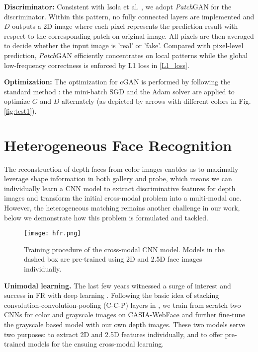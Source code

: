 \documentclass{bmvc2k}
\begin{document}
\textbf{Discriminator:} Consistent with Isola et al. \cite{isola2016image}, we adopt \textit{Patch}GAN for the discriminator. Within this pattern, no fully connected layers are implemented and $D$ outputs a 2D image where each pixel represents the prediction result with respect to the corresponding patch on original image. All pixels are then averaged to decide whether the input image is 'real' or 'fake'. Compared with pixel-level prediction, \textit{Patch}GAN efficiently concentrates on local patterns while the global low-frequency correctness is enforced by L1 loss in \eqref{L1_loss}.

\textbf{Optimization:} The optimization for cGAN is performed by following the standard method \cite{goodfellow2014generative}: the mini-batch SGD and the Adam solver are applied to optimize $G$ and $D$ alternately (as depicted by arrows with different colors in Fig. \ref{fig:test1}).

\section{Heterogeneous Face Recognition}
The reconstruction of depth faces from color images enables us to maximally leverage shape information in both gallery and probe, which means we can individually learn a CNN model to extract discriminative features for depth images and transform the initial cross-modal problem into a multi-modal one. However, the heterogeneous matching remains another challenge in our work, below we demonstrate how this problem is formulated and tackled.

\begin{figure}
\centering
\texttt{[image: hfr.png]}
\caption{Training procedure of the cross-modal CNN model. Models in the dashed box are pre-trained using 2D and 2.5D face images individually. }
\label{fig:hfr}
\end{figure}

\textbf{Unimodal learning.} The last few years witnessed a surge of interest and success in FR with deep learning \cite{taigman2014deepface, sun2015deepid3, parkhi2015deep}. Following the basic idea of stacking convolution-convolution-pooling (C-C-P) layers in \cite{lee2016accurate}, we train from scratch two CNNs for color and grayscale images on CASIA-WebFace \cite{yi2014learning} and further fine-tune the grayscale based model with our own depth images. These two models serve two purposes: to extract 2D and 2.5D features individually, and to offer pre-trained models for the ensuing cross-modal learning.
\end{document}
